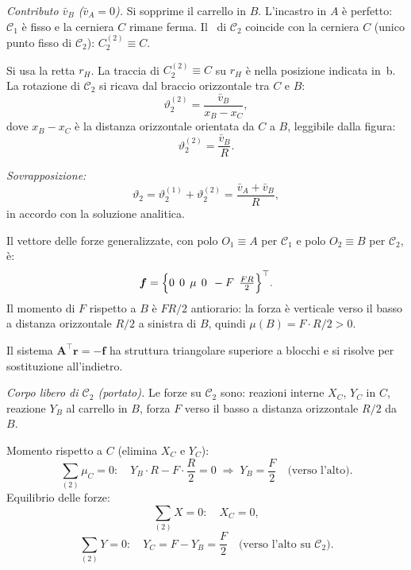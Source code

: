 \begin{esempio}
\begin{svolgimento}
		\smallskip
		\noindent\textit{Contributo $\bar{v}_B$
			($\bar{v}_A = 0$).}
		Si sopprime il carrello in $B$. L'incastro in $A$
		è perfetto: $\mathcal{C}_1$ è fisso e la cerniera
		$C$ rimane ferma. Il \CRa\ di $\mathcal{C}_2$
		coincide con la cerniera $C$ (unico punto fisso di
		$\mathcal{C}_2$): $C_2^{(2)} \equiv C$.
		
		Si usa la retta $r_H$. La traccia di
		$C_2^{(2)}\equiv C$ su $r_H$ è nella posizione
		indicata in \,b.
		La rotazione di $\mathcal{C}_2$ si ricava dal
		braccio orizzontale tra $C$ e $B$:
		\[
		\vartheta_2^{(2)} =
		\frac{\bar{v}_B}{x_B - x_C},
		\]
		dove $x_B - x_C$ è la distanza orizzontale
		orientata da $C$ a $B$, leggibile dalla figura:
		\[
		\vartheta_2^{(2)} = \frac{\bar{v}_B}{R}.
		\]
		
		\noindent\textit{Sovrapposizione:}
		\[
		\vartheta_2 =
		\vartheta_2^{(1)} + \vartheta_2^{(2)} =
		\frac{\bar{v}_A + \bar{v}_B}{R},
		\]
		in accordo con la soluzione analitica.
		
		



		
		
		
		Il vettore delle forze generalizzate, con polo
		$O_1\equiv A$ per $\mathcal{C}_1$ e polo
		$O_2\equiv B$ per $\mathcal{C}_2$, è:
		\[
		\bm{f} =
		\Bigl\{
		0\,\;0\,\;\mu\,\;
		0\,\;-F\,\;\tfrac{FR}{2}
		\Bigr\}^\top.
		\]
		Il momento di $F$ rispetto a $B$ è $FR/2$
		antiorario: la forza è verticale verso il basso
		a distanza orizzontale $R/2$ a sinistra di $B$,
		quindi $\mu(B) = F\cdot R/2 > 0$.
		
		Il sistema $\bm{A}^\top\bm{r}=-\bm{f}$ ha
		struttura triangolare superiore a blocchi e si
		risolve per sostituzione all'indietro.
		
		
		\noindent\textit{Corpo libero di $\mathcal{C}_2$
			(portato).}
		Le forze su $\mathcal{C}_2$ sono: reazioni interne
		$X_C$, $Y_C$ in $C$, reazione $Y_B$ al carrello
		in $B$, forza $F$ verso il basso a distanza
		orizzontale $R/2$ da $B$.
		
		Momento rispetto a $C$ (elimina $X_C$ e $Y_C$):
		\[
		\sum_{(2)}\mu_C = 0:\quad
		Y_B\cdot R - F\cdot\frac{R}{2} = 0
		\;\Longrightarrow\;
		Y_B = \frac{F}{2}
		\quad\text{(verso l'alto)}.
		\]
		Equilibrio delle forze:
		\[
		\sum_{(2)} X = 0:\quad X_C = 0,
		\]
		\[
		\sum_{(2)} Y = 0:\quad
		Y_C = F - Y_B = \frac{F}{2}
		\quad\text{(verso l'alto su $\mathcal{C}_2$)}.
		\]
		

\end{svolgimento}
\end{esempio}

